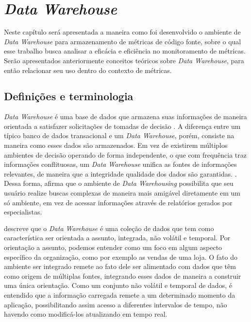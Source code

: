 \chapter{\textit{Data Warehouse}} 
\label{chap:arquitetura}

Neste capítulo será apresentada a maneira como foi desenvolvido o ambiente de \textit{Data Warehouse} para armazenamento de métricas de código fonte, sobre o qual esse trabalho busca analisar a eficácia e eficiência no monitoramento de métricas. Serão apresentados anteriormente conceitos teóricos sobre \textit{Data Warehouse}, para então relacionar seu uso dentro do contexto de métricas. 

\section{Definições e terminologia}

\textit{Data Warehouse} é uma base de dados que armazena suas informações de maneira orientada a satisfazer solicitações de tomadas de decisão \cite{chaudhuri1997}. A diferença entre um típico banco de dados transacional e um  \textit{Data Warehouse}, porém, consiste na maneira como esses dados são armazenados. Em vez de existirem múltiplos ambientes de decisão operando de forma independente, o que com frequência traz informações conflituosas, um \textit{Data Warehouse} unifica as fontes de informações relevantes, de maneira que a integridade  qualidade dos dados são garantidas. \cite{neeraj_sharma_2011}. Dessa forma, afirma que o ambiente de \textit{Data Warehousing} possibilita que seu usuário realize buscas complexas de maneira mais amigável diretamente em um só ambiente, em vez de acessar informações através de relatórios gerados por especialistas. 

 descreve que o \textit{Data Warehouse} é uma coleção de dados que tem como característica ser orientada a assunto, integrada, não volátil e temporal. Por orientação a assunto, podemos entender como um foco em algum aspecto específico da organização, como por exemplo as vendas de uma loja. O fato do ambiente ser integrado remete ao fato dele ser alimentado com dados que têm como origem de múltiplas fontes, integrando esses dados de maneira a construir uma única orientação. Como um conjunto não volátil e temporal de dados, é entendido que a informação carregada remete a um determinado momento da aplicação, possibilitando assim acesso a diferentes intervalos de tempo, não havendo como modificá-los atualizando em tempo real. 

